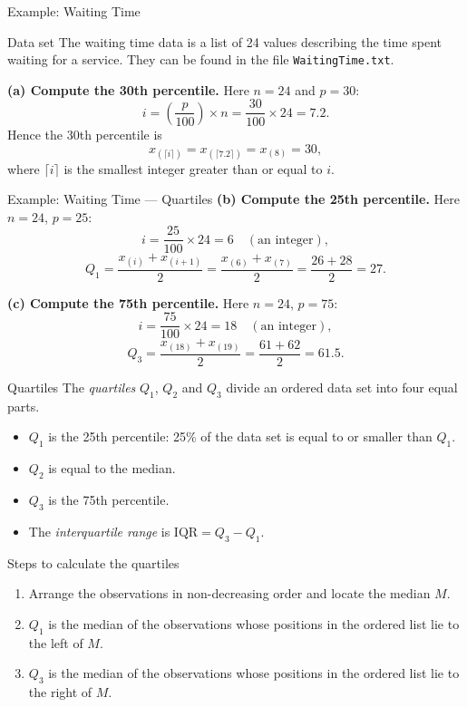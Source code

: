 \documentclass[10pt,aspectratio=169]{beamer}
\begin{document}
\begin{frame}{Example: Waiting Time}
  \begin{block}{Data set}
    The waiting time data is a list of 24 values describing the time spent
    waiting for a service. They can be found in the file
    \texttt{WaitingTime.txt}.
  \end{block}

  \textbf{(a) Compute the 30th percentile.} Here $n = 24$ and $p = 30$:
  \[
    i = \left(\frac{p}{100}\right) \times n = \frac{30}{100} \times 24 = 7.2 .
  \]
  Hence the 30th percentile is
  \[
    x_{(\lceil i \rceil)} = x_{(\lceil 7.2 \rceil)} = x_{(8)} = 30,
  \]
  where $\lceil i \rceil$ is the smallest integer greater than or equal to $i$.
\end{frame}

\begin{frame}{Example: Waiting Time --- Quartiles}
  \textbf{(b) Compute the 25th percentile.} Here $n = 24$, $p = 25$:
  \[
    i = \frac{25}{100} \times 24 = 6 \quad (\text{an integer}),
  \]
  \[
    Q_1 = \frac{x_{(i)} + x_{(i+1)}}{2}
        = \frac{x_{(6)} + x_{(7)}}{2}
        = \frac{26 + 28}{2} = 27 .
  \]

  \textbf{(c) Compute the 75th percentile.} Here $n = 24$, $p = 75$:
  \[
    i = \frac{75}{100} \times 24 = 18 \quad (\text{an integer}),
  \]
  \[
    Q_3 = \frac{x_{(18)} + x_{(19)}}{2} = \frac{61 + 62}{2} = 61.5 .
  \]
\end{frame}

\begin{frame}{Quartiles}
  The \emph{quartiles} $Q_1$, $Q_2$ and $Q_3$ divide an ordered data set into
  four equal parts.

  \begin{itemize}
    \item $Q_1$ is the 25th percentile: 25\% of the data set is equal to or
          smaller than $Q_1$.
    \item $Q_2$ is equal to the median.
    \item $Q_3$ is the 75th percentile.
    \item The \emph{interquartile range} is $\mathrm{IQR} = Q_3 - Q_1$.
  \end{itemize}

  \begin{block}{Steps to calculate the quartiles}
    \begin{enumerate}
      \item Arrange the observations in non-decreasing order and locate the
            median $M$.
      \item $Q_1$ is the median of the observations whose positions in the
            ordered list lie to the left of $M$.
      \item $Q_3$ is the median of the observations whose positions in the
            ordered list lie to the right of $M$.
    \end{enumerate}
  \end{block}
\end{frame}
\end{document}
